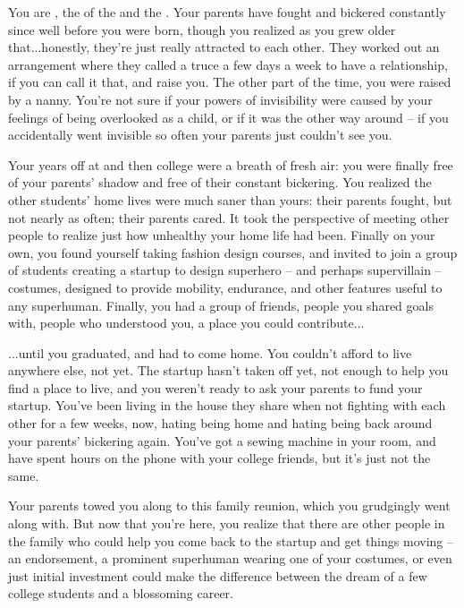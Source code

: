 \documentclass[char]{LRSguildcamp1}
\begin{document}
\name{\cGrad{}}
You are \cGrad{\intro}, the \cGrad{\offspring} of the \cOldest{\villain} \cOldest{\intro} and the \cOS{\hero} \cOS{\intro}.  Your parents have fought and bickered constantly since well before you were born, though you realized as you grew older that...honestly, they're just really attracted to each other.  They worked out an arrangement where they called a truce a few days a week to have a relationship, if you can call it that, and raise you.  The other part of the time, you were raised by a nanny.  You're not sure if your powers of invisibility were caused by your feelings of being overlooked as a child, or if it was the other way around -- if you accidentally went invisible so often your parents just couldn't see you. 

Your years off at \pSuperSchool{} and then college were a breath of fresh air: you were finally free of your parents' shadow and free of their constant bickering.  You realized the other students' home lives were much saner than yours: their parents fought, but not nearly as often; their parents cared.  It took the perspective of meeting other people to realize just how unhealthy your home life had been.  Finally on your own, you found yourself taking fashion design courses, and invited to join a group of students creating a startup to design superhero -- and perhaps supervillain -- costumes, designed to provide mobility, endurance, and other features useful to any superhuman.  Finally, you had a group of friends, people you shared goals with, people who understood you, a place you could contribute...

...until you graduated, and had to come home.  You couldn't afford to live anywhere else, not yet.  The startup hasn't taken off yet, not enough to help you find a place to live, and you weren't ready to ask your parents to fund your startup.  You've been living in the house they share when not fighting with each other for a few weeks, now, hating being home and hating being back around your parents' bickering again.  You've got a sewing machine in your room, and have spent hours on the phone with your college friends, but it's just not the same.

Your parents towed you along to this family reunion, which you grudgingly went along with.  But now that you're here, you realize that there are other people in the family who could help you come back to the startup and get things moving -- an endorsement, a prominent superhuman wearing one of your costumes, or even just initial investment could make the difference between the dream of a few college students and a blossoming career.
\end{document}
